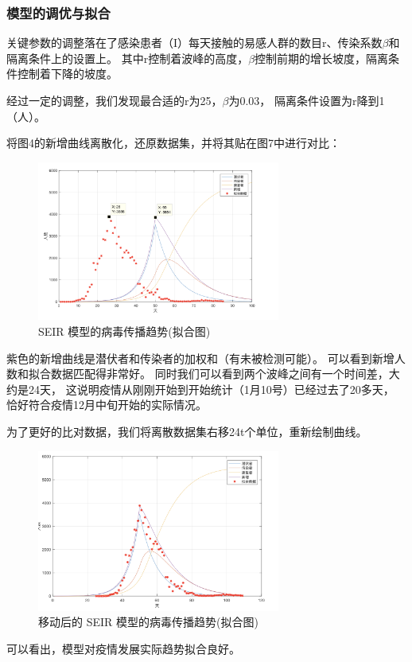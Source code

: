 \documentclass[UTF8]{ctexart}
\begin{document}
\subsubsection{模型的调优与拟合}
关键参数的调整落在了感染患者（I）每天接触的易感人群的数目r、传染系数$\beta$和隔离条件上的设置上。
其中r控制着波峰的高度，$\beta$控制前期的增长坡度，隔离条件控制着下降的坡度。
\par 经过一定的调整，我们发现最合适的r为25，$\beta$为0.03，
隔离条件设置为r降到1（人）。
\par 
将图4的新增曲线离散化，还原数据集，并将其贴在图7中进行对比：
\begin{figure}[htbp][H]
\centering
\includegraphics[width=8cm]{8.png} 
\caption{SEIR 模型的病毒传播趋势(拟合图)}
\end{figure}
\par
紫色的新增曲线是潜伏者和传染者的加权和（有未被检测可能）。
可以看到新增人数和拟合数据匹配得非常好。
同时我们可以看到两个波峰之间有一个时间差，大约是24天，
这说明疫情从刚刚开始到开始统计（1月10号）已经过去了20多天，
恰好符合疫情12月中旬开始的实际情况。
\par 
为了更好的比对数据，我们将离散数据集右移24t个单位，重新绘制曲线。

\begin{figure}[htbp][H]
\centering
\includegraphics[width=8cm]{9.png} 
\caption{移动后的 SEIR 模型的病毒传播趋势(拟合图)}
\end{figure}
\par
可以看出，模型对疫情发展实际趋势拟合良好。
\end{document}
